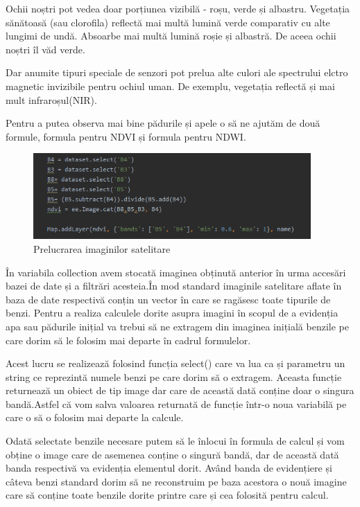 \documentclass[12pt,a4paper]{article}
\theoremstyle{definition}
\theoremstyle{remark}
\begin{document}
Ochii noștri pot vedea doar porțiunea vizibilă - roșu, verde și albastru. Vegetația sănătoasă (sau clorofila) reflectă mai multă lumină verde comparativ cu alte lungimi de undă. Absoarbe mai multă lumină roșie și albastră. De aceea ochii noștri îl văd verde.\cite{benzi}

Dar anumite tipuri speciale de senzori pot prelua alte culori ale spectrului elctro magnetic invizibile pentru ochiul uman. De exemplu, vegetația reflectă și mai mult infraroșul(NIR). \cite{benzi}

Pentru a putea observa mai bine pădurile și apele o să ne ajutăm de două formule, formula pentru NDVI și formula pentru NDWI.

\begin{figure}[H]
  \centering
  \includegraphics[width=300pt]{prelucrarebenzi.png}
  \caption{Prelucrarea imaginilor satelitare }   
\end{figure}

În variabila collection avem stocată imaginea obținută anterior în urma accesări bazei de date și a filtrări acesteia.În mod standard imaginile satelitare aflate în baza de date respectivă conțin un vector în care se ragăsesc toate tipurile de benzi. Pentru a realiza calculele dorite asupra imagini în scopul de a evidenția apa sau pădurile inițial va trebui să ne extragem din imaginea inițială benzile pe care dorim să le folosim mai departe în cadrul formulelor.



Acest lucru se realizează folosind funcția select() care va lua ca și parametru un string ce reprezintă numele benzi pe care dorim să o extragem. Aceasta funcție returnează un obiect de tip image dar care de această dată conține doar o singura bandă.Astfel că vom salva valoarea returnată de funcție într-o noua variabilă pe care o să o folosim mai departe la calcule.

Odată selectate benzile necesare putem să le înlocui în formula de calcul și vom obține o image care de asemenea conține o singură bandă, dar de această dată banda respectivă va evidenția elementul dorit. Având banda de evidențiere și câteva benzi standard dorim să ne  reconstruim pe baza acestora o nouă imagine care să conține toate benzile dorite printre care și cea folosită pentru calcul.
\end{document}
